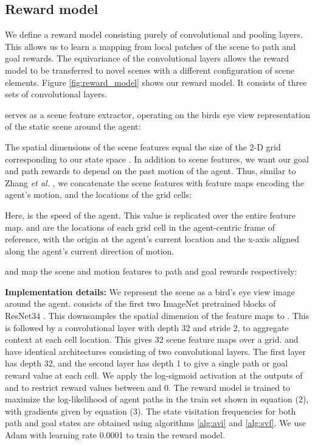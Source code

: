 \documentclass[journal]{IEEEtran}
\begin{document}
\subsection{Reward model}\label{sec:reward_model}
We define a reward model consisting purely of convolutional and pooling layers. This allows us to learn a mapping from local patches of the scene to path and goal rewards. The equivariance of the convolutional layers allows the reward model to be transferred to novel scenes with a different configuration of scene elements. Figure \ref{fig:reward_model} shows our reward model. It consists of three sets of convolutional layers. 

 serves as a scene feature extractor, operating on the birds eye view representation  of the static scene around the agent: 

The spatial dimensions of the scene features  equal the size of the 2-D grid corresponding to our state space . In addition to scene features, we want our goal and path rewards to depend on the past motion of the agent. Thus, similar to Zhang \textit{et al.} \cite{zhang2018integrating}, we concatenate the scene features with feature maps encoding the agent's motion, and the locations of the grid cells:

Here,  is the speed of the agent. This value is replicated over the entire feature map.  and  are the locations of each grid cell in the agent-centric frame of reference, with the origin at the agent's current location and the x-axis aligned along the agent's current direction of motion. 

 and  map the scene and motion features to path and goal rewards respectively:




\noindent\textbf{Implementation details:}
We represent the scene as a  bird's eye view image around the agent.  consists of the first two ImageNet pretrained blocks of ResNet34 \cite{he2016deep}. This downsamples the spatial dimension of the feature maps to . This is followed by a  convolutional layer with depth 32 and stride 2, to aggregate context at each cell location. This gives 32 scene feature maps over a  grid.  and  have identical architectures consisting of two  convolutional layers. The first layer has depth 32, and the second layer has depth 1 to give a single path or goal reward value at each cell. We apply the log-sigmoid activation at the outputs of  and  to restrict reward values between  and 0. The reward model is trained to maximize the log-likelihood  of agent paths in the train set shown in equation (2), with gradients given by equation (3). The state visitation frequencies  for both path and goal states are obtained using algorithms \ref{alg:avi} and \ref{alg:svf}. We use Adam \cite{kingma2014adam} with learning rate 0.0001 to train the reward model. 
\end{document}
